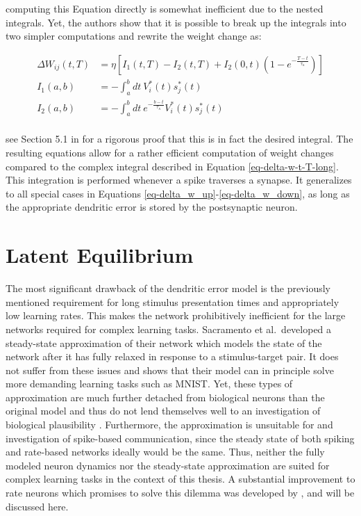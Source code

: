 computing this Equation directly is somewhat inefficient due to the nested integrals. Yet, the authors show that it is
possible to break up the integrals into two simpler computations and rewrite the weight change as:


\begin{align}
  \Delta W_{ij}(t, T) & = \eta \left[ I_1 (t, T) - I_2(t,T) + I_2(0,t)\left( 1- e^{-\frac{T-t}{\tau_\kappa}} \right) \right]\label{eq-proof-start} \\
  I_1(a, b)           & = -\int_{a}^{b} dt \ V_i^\ast (t) s_j^\ast (t)                                                                             \\
  I_2(a, b)           & = -\int_{a}^{b} dt \ e^{-\frac{b-t}{\tau_\kappa}} V_i^\ast (t) s_j^\ast (t)\label{eq-proof-end}                            \\
\end{align}

see Section 5.1 in \citep{Stapmanns2021} for a rigorous proof that this is in fact the desired integral. The resulting
equations allow for a rather efficient computation of weight changes compared to the complex integral described in
Equation \ref{eq-delta-w-t-T-long}. This integration is performed whenever a spike traverses a synapse. It generalizes
to all special cases in Equations \ref{eq-delta_w_up}-\ref{eq-delta_w_down}, as long as the appropriate dendritic error
is stored by the postsynaptic neuron.

\section{Latent Equilibrium}\label{sec-latent-eq}

The most significant drawback of the dendritic error model is the previously mentioned requirement for long stimulus
presentation times and appropriately low learning rates. This makes the network prohibitively inefficient for the large
networks required for complex learning tasks. Sacramento et al.\ developed a steady-state approximation of their network
which models the state of the network after it has fully relaxed in response to a stimulus-target pair. It does not
suffer from these issues and shows that their model can in principle solve more demanding learning tasks such as MNIST.
Yet, these types of approximation are much further detached from biological neurons than the original model and thus do
not lend themselves well to an investigation of biological plausibility \citep{Gerstner2009}. Furthermore, the
approximation is unsuitable for and investigation of spike-based communication, since the steady state of both spiking
and rate-based networks ideally would be the same. Thus, neither the fully modeled neuron dynamics nor the steady-state
approximation are suited for complex learning tasks in the context of this thesis. A substantial improvement to rate
neurons which promises to solve this dilemma was developed by \citep{Haider2021}, and will be discussed here.

